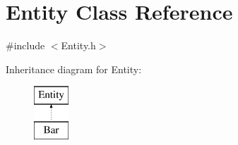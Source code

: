 \hypertarget{class_entity}{}\section{Entity Class Reference}
\label{class_entity}


{\ttfamily \#include $<$Entity.\+h$>$}

Inheritance diagram for Entity\+:\begin{figure}[H]
\begin{center}
\leavevmode
\includegraphics[height=2.000000cm]{class_entity}
\end{center}
\end{figure}
